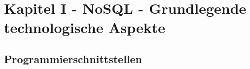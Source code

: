 \chapter{Kapitel I - NoSQL - Grundlegende technologische Aspekte}
\setcounter{section}{7}
\section{Programmierschnittstellen}


